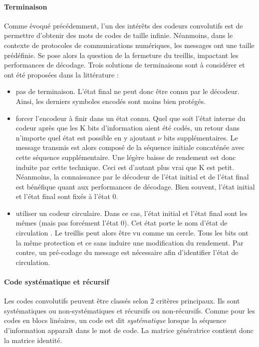 \paragraph*{Terminaison}\label{par:term}
Comme évoqué précédemment, l'un des intérêts des codeurs convolutifs est de permettre d'obtenir des mots de codes de 
taille infinie. Néanmoins, dans le contexte de protocoles de communications numériques, les messages ont une taille 
prédéfinie. 
Se pose alors la question de la fermeture du treillis, impactant les performances de décodage.
Trois solutions de terminaisons sont à considérer et ont été proposées dans la littérature :
\begin{itemize}
	\item pas de terminaison. L'état final ne peut donc être connu par le décodeur. Ainsi, les derniers symboles encodés
	      sont moins bien protégés. 
	\item forcer l'encodeur à finir dans un état connu. 
	      Quel que soit l'état interne du codeur après que les K bits d'information aient été codés, un retour dans n'importe 
	      quel état est possible en y ajoutant $\nu$ bits supplémentaires. Le message transmis est alors composé de la 
	      séquence initiale concaténée avec cette séquence supplémentaire. Une légère baisse de rendement est donc induite par cette technique. 
	      Ceci est d'autant plus vrai que K est petit. 
	      Néanmoins, la connaissance par le décodeur de l'état initial et de l'état final est bénéfique quant aux performances de décodage. Bien souvent, l'état initial et l'état final sont fixés à l'état 0.
	\item utiliser un codeur circulaire. Dans ce cas, l'état initial et l'état final sont les mêmes (mais pas forcément 
	      l'état 0). Cet état porte le nom d'état de circulation \cite{circular}. Le treillis peut alors être vu comme un 
	      cercle. Tous les bits ont la même protection et ce sans induire une modification du rendement. Par contre, 
	      un pré-codage du message est nécessaire afin d'identifier l'état de circulation.
\end{itemize}

\paragraph*{Code systématique et récursif}
Les codes convolutifs peuvent être classés selon 2 critères principaux. Ils sont systématiques ou non-systématiques et récursifs ou non-récursifs. 
Comme pour les codes en blocs linéaires, un code est dit \emph{systématique} lorsque la séquence 
d'information apparaît dans le mot de code. La matrice génératrice contient donc la matrice identité. 

